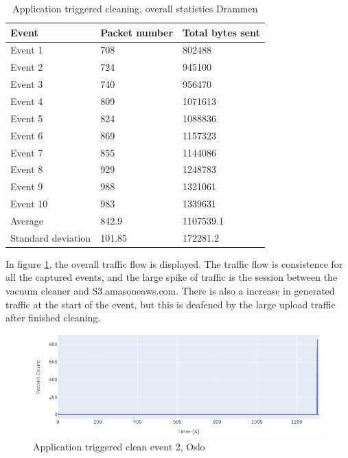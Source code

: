 \begin{table}[H]
\centering
\caption{Application triggered cleaning, overall statistics Drammen}
\label{tab:TCoverallDRA}
\begin{tabular}{|l|l|l|}
\hline
\textbf{Event} & \textbf{Packet number} & \textbf{Total bytes sent} \\ \hline
Event 1        & 708                    & 802488                    \\ \hline
Event 2        & 724                    & 945100                    \\ \hline
Event 3        & 740                    & 956470                    \\ \hline
Event 4        & 809                    & 1071613                   \\ \hline
Event 5        & 824                    & 1088836                   \\ \hline
Event 6        & 869                    & 1157323                   \\ \hline
Event 7        & 855                    & 1144086                   \\ \hline
Event 8        & 929                    & 1248783                   \\ \hline
Event 9        & 988                    & 1321061                   \\ \hline
Event 10       & 983                    & 1339631                   \\ \hline
Average        & 842.9                  & 1107539.1                 \\ \hline
Standard deviation        & 101.85
       & 172281.2               \\ \hline
\end{tabular}
\end{table}

In figure \ref{fig:Tc-graph}, the overall traffic flow is displayed. The traffic flow is consistence for all the captured events, and the large spike of traffic is the session between the vacuum cleaner and S3.amasoneaws.com. There is also a increase in generated traffic at the start of the event, but this is 
deafened by the large upload traffic after finished cleaning.

\begin{figure}[H]
    \centering
    \includegraphics[width=\textwidth]{figures/TC-graph.png}
    \caption{Application triggered clean event 2, Oslo}
    \label{fig:Tc-graph}
\end{figure}

